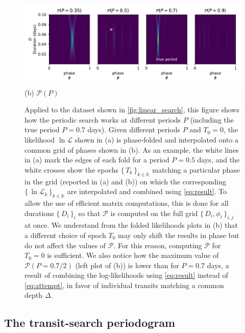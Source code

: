 \documentclass[modern]{aastex631}
\newcommand{\set}[1]{\{\,#1\,\}}
\begin{document}
\begin{figure}[H]
    \centering
    \includegraphics[width=\linewidth]{../workflows/principle/figures/principle_periodic_1.pdf}\\
    {(b) $\mathcal{P}(P)$}

    \caption{Applied to the dataset shown in \autoref{fig:linear_search}, this figure shows how the periodic search works at different periods $P$ (including the true period $P = 0.7$ days). Given different periods $P$ and $T_0=0$, the likelihood $\ln\mathcal{L}$ shown in (a) is phase-folded and interpolated onto a common grid of phases shown in (b). As an example, the white lines in (a) mark the edges of each fold for a period $P=0.5$ days, and the white crosses show the epochs $\set{T_k}_{k\in\mathbb{K}}$ matching a particular phase in the grid (reported in (a) and (b)) on which the corresponding $\set{\ln \mathcal{L}_k}_{k\in\mathbb{K}}$ are interpolated and combined using \autoref{eq:result}. To allow the use of efficient matrix computations, this is done for all durations $\set{D_i}_i$ so that $\mathcal{P}$ is computed on the full grid $\set{D_i, \phi_i}_{i, j}$ at once. We understand from the folded likelihoods plots in (b) that a different choice of epoch $T_0$ may only shift the results in phase but do not affect the values of $\mathcal{P}$. For this reason, computing $\mathcal{P}$ for $T_0=0$ is sufficient. We also notice how the maximum value of $\mathcal{P}(P=0.7/2)$ (left plot of (b)) is lower than for $P=0.7$ days, a result of combining the log-likelihoods using \autoref{eq:result} instead of \autoref{eq:attempt}, in favor of individual transits matching a common depth $\Delta$.}
    \label{fig:periodic_search}
\end{figure}

\subsection{The transit-search periodogram}\label{periodogram}
\end{document}
